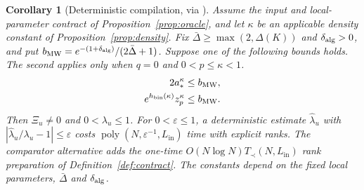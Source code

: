 \documentclass[10pt,twocolumn]{article}
\newtheorem{corollary}[theorem]{Corollary}
\theoremstyle{definition}
\DeclareMathOperator{\poly}{poly}
\newcommand{\Lin}{L_{\mathrm{in}}}
\newcommand{\Tprec}{T_{\prec}}
\begin{document}
\begin{corollary}[Deterministic compilation, via {\cite[Thm.~1]{MW25}}]
\label{thm:compiler}
Assume the input and local-parameter contract of
Proposition~\ref{prop:oracle}, and let $\kappa$ be an applicable density
constant of Proposition~\ref{prop:density}. Fix
$\bar\Delta\ge\max(2,\Delta(K))$ and $\delta_{\rm alg}>0$, and put
$b_{\rm MW}=e^{-(1+\delta_{\rm alg})}/(2\bar\Delta+1)$.
Suppose one of the following bounds holds. The second applies only
when $q=0$ and $0<p\le\kappa<1$.
\begin{align}
 2a_\ast^\kappa &\le b_{\rm MW},\label{eq:envelope}\\
 e^{h_{\rm bin}(\kappa)}z_p^\kappa &\le b_{\rm MW}.\label{eq:entropy-envelope}
\end{align}
Then $\Xi_u\ne0$ and $0<\lambda_u\le1$. For $0<\varepsilon\le1$,
a deterministic estimate $\widehat\lambda_u$ with
$|\widehat\lambda_u/\lambda_u-1|\le\varepsilon$ costs
$\poly(N,\varepsilon^{-1},\Lin)$ time with explicit ranks. The
comparator alternative adds the one-time $O(N\log N)\Tprec(N,\Lin)$
rank preparation of Definition~\ref{def:contract}. The constants
depend on the fixed local parameters, $\bar\Delta$ and $\delta_{\rm alg}$.
\end{corollary}
\end{document}
